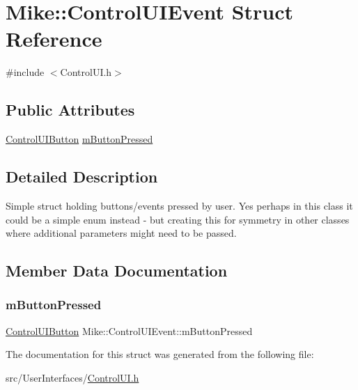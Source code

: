 \hypertarget{struct_mike_1_1_control_u_i_event}{}\section{Mike\+:\+:Control\+U\+I\+Event Struct Reference}
\label{struct_mike_1_1_control_u_i_event}


{\ttfamily \#include $<$Control\+U\+I.\+h$>$}

\subsection*{Public Attributes}
\begin{DoxyCompactItemize}
\item 
\hyperlink{namespace_mike_ab036b30a5fb5ef61314086e0c2c5ca6a}{Control\+U\+I\+Button} \hyperlink{struct_mike_1_1_control_u_i_event_adf53b39417816ab95cd27ab7dec31707}{m\+Button\+Pressed}
\end{DoxyCompactItemize}


\subsection{Detailed Description}
Simple struct holding buttons/events pressed by user. Yes perhaps in this class it could be a simple enum instead -\/ but creating this for symmetry in other classes where additional parameters might need to be passed. 

\subsection{Member Data Documentation}
\mbox{\label{struct_mike_1_1_control_u_i_event_adf53b39417816ab95cd27ab7dec31707}} 
\subsubsection{\texorpdfstring{m\+Button\+Pressed}{mButtonPressed}}
{\footnotesize\ttfamily \hyperlink{namespace_mike_ab036b30a5fb5ef61314086e0c2c5ca6a}{Control\+U\+I\+Button} Mike\+::\+Control\+U\+I\+Event\+::m\+Button\+Pressed}



The documentation for this struct was generated from the following file\+:\begin{DoxyCompactItemize}
\item 
src/\+User\+Interfaces/\hyperlink{_control_u_i_8h}{Control\+U\+I.\+h}\end{DoxyCompactItemize}
